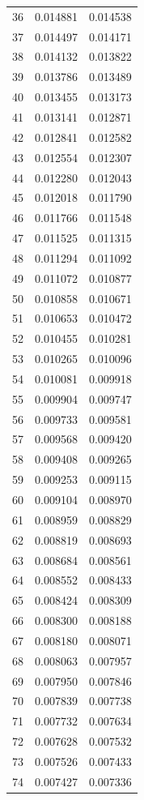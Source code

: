 \begin{tabular}{lrr}
36 & 0.014881 & 0.014538 \\
37 & 0.014497 & 0.014171 \\
38 & 0.014132 & 0.013822 \\
39 & 0.013786 & 0.013489 \\
40 & 0.013455 & 0.013173 \\
41 & 0.013141 & 0.012871 \\
42 & 0.012841 & 0.012582 \\
43 & 0.012554 & 0.012307 \\
44 & 0.012280 & 0.012043 \\
45 & 0.012018 & 0.011790 \\
46 & 0.011766 & 0.011548 \\
47 & 0.011525 & 0.011315 \\
48 & 0.011294 & 0.011092 \\
49 & 0.011072 & 0.010877 \\
50 & 0.010858 & 0.010671 \\
51 & 0.010653 & 0.010472 \\
52 & 0.010455 & 0.010281 \\
53 & 0.010265 & 0.010096 \\
54 & 0.010081 & 0.009918 \\
55 & 0.009904 & 0.009747 \\
56 & 0.009733 & 0.009581 \\
57 & 0.009568 & 0.009420 \\
58 & 0.009408 & 0.009265 \\
59 & 0.009253 & 0.009115 \\
60 & 0.009104 & 0.008970 \\
61 & 0.008959 & 0.008829 \\
62 & 0.008819 & 0.008693 \\
63 & 0.008684 & 0.008561 \\
64 & 0.008552 & 0.008433 \\
65 & 0.008424 & 0.008309 \\
66 & 0.008300 & 0.008188 \\
67 & 0.008180 & 0.008071 \\
68 & 0.008063 & 0.007957 \\
69 & 0.007950 & 0.007846 \\
70 & 0.007839 & 0.007738 \\
71 & 0.007732 & 0.007634 \\
72 & 0.007628 & 0.007532 \\
73 & 0.007526 & 0.007433 \\
74 & 0.007427 & 0.007336 \\

\end{tabular}
